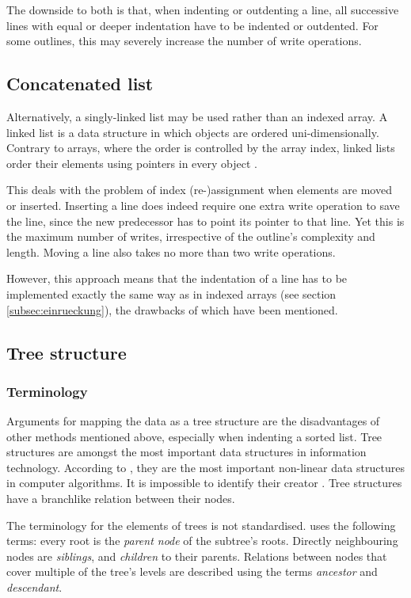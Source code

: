 The downside to both is that, when indenting or outdenting a line, all successive lines with equal or deeper indentation have to be indented or outdented. For some outlines, this may severely increase the number of write operations.


\subsection{Concatenated list}

Alternatively, a singly-linked list may be used rather than an indexed array. A linked list is a data structure in which objects are ordered uni-dimensionally. Contrary to arrays, where the order is controlled by the array index, linked lists order their elements using pointers in every object .

This deals with the problem of index (re-)assignment when elements are moved or inserted. Inserting a line does indeed require one extra write operation to save the line, since the new predecessor has to point its pointer to that line. Yet this is the maximum number of writes, irrespective of the outline's complexity and length. Moving a line also takes no more than two write operations.

However, this approach means that the indentation of a line has to be implemented exactly the same way as in indexed arrays (see section \ref{subsec:einrueckung}), the drawbacks of which have been mentioned.


\subsection{Tree structure}

\subsubsection{Terminology}

Arguments for mapping the data as a tree structure are the disadvantages of other methods mentioned above, especially when indenting a sorted list. Tree structures are amongst the most important data structures in information technology. According to , they are the most important non-linear data structures in computer algorithms. It is impossible to identify their creator . Tree structures have a branchlike relation between their nodes.

The terminology for the elements of trees is not standardised.  uses the following terms: every root is the \textit{parent node} of the subtree's roots. Directly neighbouring nodes are \textit{siblings}, and \textit{children} to their parents. Relations between nodes that cover multiple of the tree's levels are described using the terms \textit{ancestor} and \textit{descendant}.

